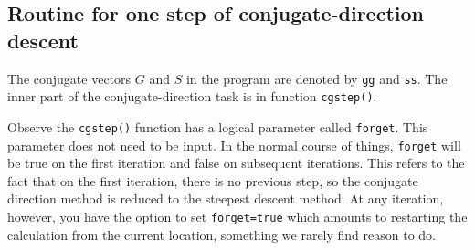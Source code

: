 \subsection{Routine for one step of conjugate-direction descent}
\par
\begin{comment}
The \bx{conjugate-direction program}
can be divided into two parts:
an inner part that is used almost without change
over a wide variety of applications,
and an outer part containing memory allocations,
operator invocations, and initializations.

Because \bx{Fortran} does not recognize the difference between upper- and
lower-case letters,
\end{comment}
The conjugate vectors $G$ and $S$ in the program are denoted by
{\tt gg} and {\tt ss}.
The inner part of the conjugate-direction task is in
function {\tt cgstep()}.%
\par
Observe the \texttt{cgstep()} function has a logical parameter
called \texttt{forget}.
This parameter does not need to be input.
In the normal course of things, \texttt{forget} will be true
on the first iteration and false on subsequent iterations.
This refers to the fact that on the first iteration,
there is no previous step,
so the conjugate direction method
is reduced to the steepest descent method.
At any iteration, however, you have the option to set
\texttt{forget=true}
which amounts to restarting the calculation
from the current location,
something we rarely find reason to do.



